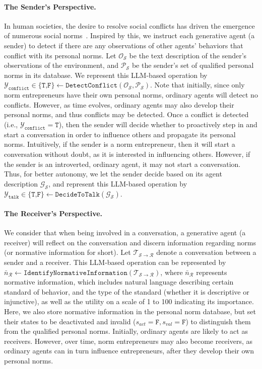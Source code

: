 \documentclass{article}
\begin{document}
\paragraph{The Sender's Perspective.}
In human societies, the desire to resolve social conflicts has driven the emergence of numerous social norms~\cite{branscombe2022social}.
Inspired by this, we instruct each generative agent (a sender) to detect if there are any observations of other agents' behaviors that conflict with its  personal norms. Let $\mathcal{O_S}$ be the text description of the sender's observations of the environment, and $\mathcal{P_S}$ be the sender's set of qualified personal norms in its database. We represent this LLM-based operation by $\mathcal{Y}_{\texttt{conflict}}\in\{\texttt{T,F}\} \leftarrow \texttt{DetectConflict}(\mathcal{O_S}, \mathcal{P_S})$. Note that initially, since only norm entrepreneurs have their own personal norms, ordinary agents will detect no conflicts. However, as time evolves, ordinary agents may also develop their personal norms, and thus conflicts may be detected.
Once a conflict is detected (i.e., $\mathcal{Y}_{\texttt{conflict}}=\texttt{T}$), then the sender will decide whether to proactively step in and start a conversation in order to influence others and propagate its personal norms. 
Intuitively, if the sender is a norm entrepreneur, then it will start a conversation without doubt, as it is interested in influencing others. 
However, if the sender is an introverted, ordinary agent, it may not start a conversation. 
Thus, for better autonomy, we let the sender decide based on its agent description $\mathcal{G_S}$, and represent this LLM-based operation by $\mathcal{Y}_{\texttt{talk}} \in\{\texttt{T,F}\} \leftarrow \texttt{DecideToTalk}(\mathcal{G_S})$.
\paragraph{The Receiver's Perspective.} 
We consider that when being involved in a conversation, a generative agent (a receiver) will reflect on the conversation and discern information regarding norms (or normative information for short).
Let $\mathcal{T_{S \rightarrow R}}$ denote a conversation between a sender and a receiver.
This LLM-based operation can be represented by $\bar{n}_{\mathcal{R}} \leftarrow \texttt{IdentifyNormativeInformation}(\mathcal{T_{S \rightarrow R}})$, where $\bar{n}_{\mathcal{R}}$ represents normative information, which includes natural language describing certain standard of behavior, and the type of the standard (whether it is descriptive or injunctive), as well as the utility on a scale of 1 to 100 indicating its importance.
Here, we also store normative information in the personal norm database, but set their states to be deactivated and invalid ($s_{act}=\texttt{F}, s_{val}=\texttt{F}$) to distinguish them from the qualified personal norms. 
Initially, ordinary agents are likely to act as receivers.
However, over time, norm entrepreneurs may also become receivers, as ordinary agents can in turn influence entrepreneurs, after they develop their own personal norms. 
\end{document}

